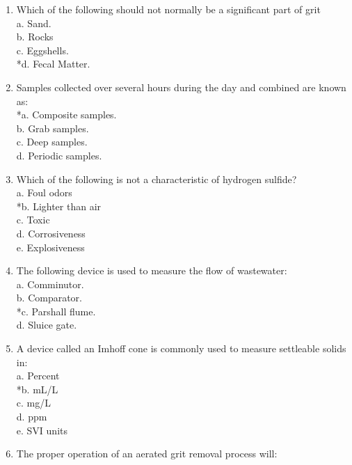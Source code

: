 \begin{enumerate}
\vspace{0.4cm}
\item  Which of the following should not normally be a significant part of grit \\

a. Sand. \\
b. Rocks \\
c. Eggshells. \\
*d. Fecal Matter. 

\vspace{0.4cm}
\item  Samples collected over several hours during the day and combined are known as: \\

*a. Composite samples. \\
b. Grab samples. \\
c. Deep samples. \\
d. Periodic samples. 

\vspace{0.4cm}
\item  Which of the following is not a characteristic of hydrogen sulfide? \\

a. Foul odors \\
*b. Lighter than air \\
c. Toxic \\
d. Corrosiveness \\
e. Explosiveness 

\vspace{0.4cm}
\item  The following device is used to measure the flow of wastewater: \\

a. Comminutor. \\
b. Comparator. \\
*c. Parshall flume. \\
d. Sluice gate. 

\vspace{0.4cm}
\item A device called an Imhoff cone is commonly used to measure settleable solids in: \\

a. Percent \\
*b. mL/L \\
c. mg/L \\
d. ppm \\
e. SVI units 


\vspace{0.4cm}
\item  The proper operation of an aerated grit removal process will: \\


\end{enumerate}
